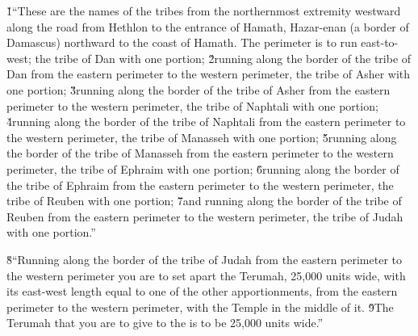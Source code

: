 \v{1}``These are the names of the tribes from the northernmost extremity westward along the road from Hethlon to the entrance of Hamath, Hazar-enan (a border of Damascus) northward to the coast of Hamath. The perimeter is to run east-to-west; the tribe of Dan with one portion; \v{2}running along the border of the tribe of Dan from the eastern perimeter to the western perimeter, the tribe of Asher with one portion; \v{3}running along the border of the tribe of Asher from the eastern perimeter to the western perimeter, the tribe of Naphtali with one portion; \v{4}running along the border of the tribe of Naphtali from the eastern perimeter to the western perimeter, the tribe of Manasseh with one portion; \v{5}running along the border of the tribe of Manasseh from the eastern perimeter to the western perimeter, the tribe of Ephraim with one portion; \v{6}running along the border of the tribe of Ephraim from the eastern perimeter to the western perimeter, the tribe of Reuben with one portion; \v{7}and running along the border of the tribe of Reuben from the eastern perimeter to the western perimeter, the tribe of Judah with one portion.''

\v{8}``Running along the border of the tribe of Judah from the eastern perimeter to the western perimeter you are to set apart the Terumah, 25,000 units wide, with its east-west length equal to one of the other apportionments, from the eastern perimeter to the western perimeter, with the Temple in the middle of it. \v{9}The Terumah that you are to give to the  is to be 25,000 units wide.''

